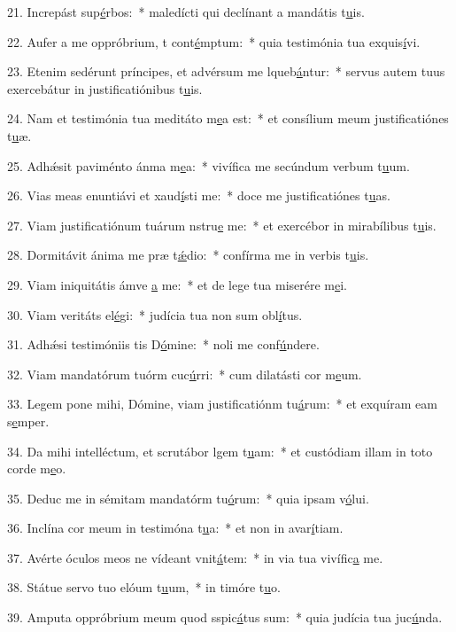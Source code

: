21. Increpást sup\uline{é}rbos:~* maledícti qui declínant a mandátis t\uline{u}is.\par 
22. Aufer a me oppróbrium, t cont\uline{é}mptum:~* quia testimónia tua exquis\uline{í}vi.\par 
23. Etenim sedérunt príncipes, et advérsum me lqueb\uline{á}ntur:~* servus autem tuus exercebátur in justificatiónibus t\uline{u}is.\par 
24. Nam et testimónia tua meditáto m\uline{e}a est:~* et consílium meum justificatiónes t\uline{u}æ.\par 
25. Adhǽsit paviménto ánma m\uline{e}a:~* vivífica me secúndum verbum t\uline{u}um.\par 
26. Vias meas enuntiávi et xaud\uline{í}sti me:~* doce me justificatiónes t\uline{u}as.\par 
27. Viam justificatiónum tuárum nstru\uline{e} me:~* et exercébor in mirabílibus t\uline{u}is.\par 
28. Dormitávit ánima me præ t\uline{ǽ}dio:~* confírma me in verbis t\uline{u}is.\par 
29. Viam iniquitátis ámve \uline{a} me:~* et de lege tua miserére m\uline{e}i.\par 
30. Viam veritáts el\uline{é}gi:~* judícia tua non sum obl\uline{í}tus.\par 
31. Adhǽsi testimóniis tis D\uline{ó}mine:~* noli me conf\uline{ú}ndere.\par 
32. Viam mandatórum tuórm cuc\uline{ú}rri:~* cum dilatásti cor m\uline{e}um.\par 
33. Legem pone mihi, Dómine, viam justificatiónm tu\uline{á}rum:~* et exquíram eam s\uline{e}mper.\par 
34. Da mihi intelléctum, et scrutábor lgem t\uline{u}am:~* et custódiam illam in toto corde m\uline{e}o.\par 
35. Deduc me in sémitam mandatórm tu\uline{ó}rum:~* quia ipsam v\uline{ó}lui.\par 
36. Inclína cor meum in testimóna t\uline{u}a:~* et non in avar\uline{í}tiam.\par 
37. Avérte óculos meos ne vídeant vnit\uline{á}tem:~* in via tua vivífic\uline{a} me.\par 
38. Státue servo tuo elóum t\uline{u}um,~* in timóre t\uline{u}o.\par 
39. Amputa oppróbrium meum quod sspic\uline{á}tus sum:~* quia judícia tua juc\uline{ú}nda.\par 
